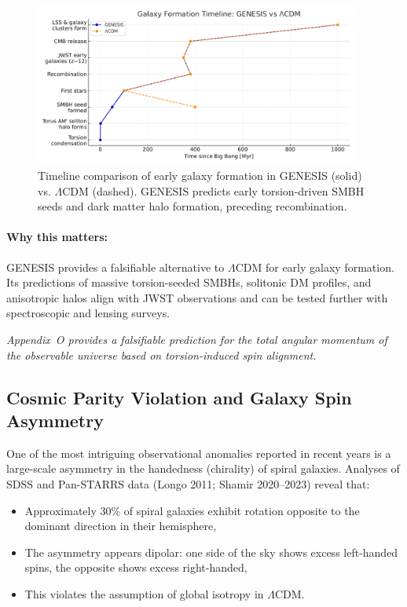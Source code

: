 \documentclass{article}
\begin{document}
\begin{figure}[h!]
\centering
\includegraphics[width=0.95\textwidth]{Timeline_GENESIS_vs_LCDM.pdf}
\caption{Timeline comparison of early galaxy formation in GENESIS (solid) vs. $\Lambda$CDM (dashed). GENESIS predicts early torsion-driven SMBH seeds and dark matter halo formation, preceding recombination.}
\label{fig:galaxy_timeline}
\end{figure}


\begin{tcolorbox}[colback=gray!5, colframe=black!30, title=Why this matters]

\paragraph{Why this matters:}
GENESIS provides a falsifiable alternative to $\Lambda$CDM for early galaxy formation. Its predictions of massive torsion-seeded SMBHs, solitonic DM profiles, and anisotropic halos align with JWST observations and can be tested further with spectroscopic and lensing surveys.

\end{tcolorbox}

\vspace{0.5em}
\noindent
\textit{Appendix~O provides a falsifiable prediction for the total angular momentum of the observable universe based on torsion-induced spin alignment.}


\subsection{ Cosmic Parity Violation and Galaxy Spin Asymmetry}
\label{sec:galaxy_spin_asymmetry}

One of the most intriguing observational anomalies reported in recent years is a large-scale asymmetry in the handedness (chirality) of spiral galaxies. Analyses of SDSS and Pan-STARRS data (Longo 2011; Shamir 2020--2023) reveal that:
\begin{itemize}
  \item Approximately 30\% of spiral galaxies exhibit rotation opposite to the dominant direction in their hemisphere,
  \item The asymmetry appears dipolar: one side of the sky shows excess left-handed spins, the opposite shows excess right-handed,
  \item This violates the assumption of global isotropy in $\Lambda$CDM.
\end{itemize}
\end{document}
